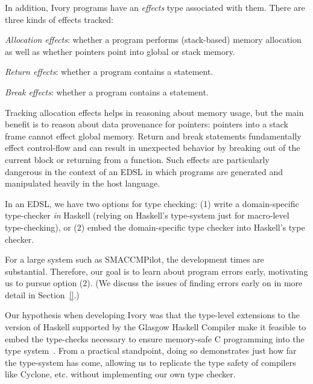 In addition, Ivory programs have an \emph{effects} type associated with them.
There are three kinds of effects tracked:
\begin{compactitem}
  \item \emph{Allocation effects}: whether a program performs (stack-based)
    memory allocation as well as whether pointers point into global or stack memory.
  \item \emph{Return effects}: whether a program contains a  statement.
  \item \emph{Break effects}: whether a program contains a 
    statement.
\end{compactitem}
\noindent
Tracking allocation effects helps in reasoning about memory usage, but the main
benefit is to reason about data provenance for pointers: pointers into a stack
frame cannot effect global memory.  Return and break statements fundamentally
effect control-flow and can result in unexpected behavior by breaking out of the
current block or returning from a function.  Such effects are particularly
dangerous in the context of an EDSL in which programs are generated and
manipulated heavily in the host language.

In an EDSL, we have two options for type checking: (1) write a domain-specific
type-checker \emph{in} Haskell (relying on Haskell's type-system just for
macro-level type-checking), or (2) embed the domain-specific type checker into
Haskell's type checker.

For a large system such as SMACCMPilot, the development times are substantial.
Therefore, our goal is to learn about program errors early, motivating us to
pursue option (2).  (We discuss the issues of finding errors early on in more
detail in Section~\ref{}.)

Our hypothesis when developing Ivory was that the type-level extensions to the
version of Haskell supported by the Glasgow Haskell Compiler make it feasible to
embed the type-checks necessary to ensure memory-safe C programming into the
type system~\cite{dephaskell}.  From a practical standpoint, doing so
demonstrates just how far the type-system has come, allowing us to replicate the
type safety of compilers like Cyclone, etc. without implementing our own type
checker.

